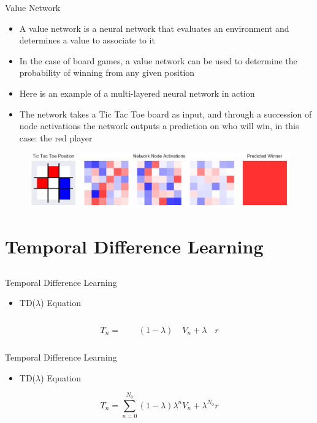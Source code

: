 \begin{frame}{Value Network}
\begin{itemize}
\item A value network is a neural network that evaluates an environment and determines a value to associate to it
\item In the case of board games, a value network can be used to determine the probability of winning from any given position
\item Here is an example of a multi-layered neural network in action
\item The network takes a Tic Tac Toe board as input, and through a succession of node activations the network outputs a prediction on who will win, in this case: the red player
\end{itemize}
\begin{figure}
\includegraphics[width=1. \textwidth]{network_weights}
\end{figure}
\end{frame}

\section{Temporal Difference Learning}
\subsection{}
\begin{frame}{Temporal Difference Learning}
\begin{itemize}
\item TD($\lambda$) Equation
\end{itemize}
\begin{equation*}
T_n = \phantom{\sum_{n=0}^{N_0} }(1-\lambda)\phantom{\lambda^n} V_n + \lambda^{\phantom{N_0}} r
\end{equation*}
\end{frame}

\begin{frame}{Temporal Difference Learning}
\begin{itemize}
\item TD($\lambda$) Equation
\end{itemize}
\begin{equation*}
T_n = \sum_{n=0}^{N_0} (1-\lambda)\lambda^n V_n + \lambda^{N_0} r
\end{equation*}
\end{frame}
